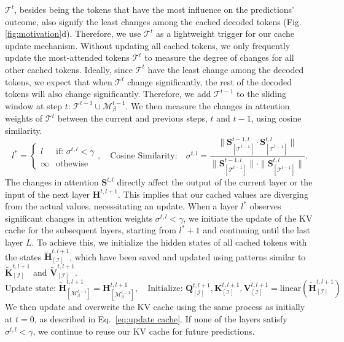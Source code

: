 \documentclass{article} %
\theoremstyle{definition}
\theoremstyle{remark}
\begin{document}
$\mathcal{T}^t$, besides being the tokens that have the most influence on the predictions’ outcome, also signify the least changes among the cached decoded tokens (Fig. \ref{fig:motivation}d). Therefore, we use $\mathcal{T}^t$ as a lightweight trigger for our cache update mechanism. Without updating all cached tokens, we only frequently update the most-attended tokens $\mathcal{T}^t$ to measure the degree of changes for all other cached tokens. Ideally, since $\mathcal{T}^t$ have the least change among the decoded tokens, we expect that when $\mathcal{T}^t$ change significantly, the rest of the decoded tokens will also change significantly. Therefore, we add $\mathcal{T}^{t-1}$ to the sliding window at step $t$: $\mathcal{T}^{t-1} \cup \mathcal{M}^{t-1}_{\beta}$. We then measure the changes in attention weights of $\mathcal{T}^t$ between the current and previous steps, $t$ and $t-1$, using cosine similarity.
\begin{equation}
 l^* = \left\{ \begin{matrix}
     l & \text{if: }  \sigma^{t,l} < \gamma \\ 
     \infty & \text{othewise}
 \end{matrix} \right.,  \quad
 \text{Cosine Similarity:} \quad \sigma^{t,l} =  \frac{\|\mathbf{S}^{t-1,l}_{[\mathcal{T}^{t-1}]} \cdot \mathbf{S}^{t,l}_{[\mathcal{T}^{t-1}]}\|}{\|\mathbf{S}^{t-1,l}_{[\mathcal{T}^{t-1}]}\| \cdot \|\mathbf{S}^{t,l}_{[\mathcal{T}^{t-1}]}\|}.
\end{equation}
The changes in attention $\mathbf{S}^{t,l}$ directly affect the output of the current layer or the input of the next layer $\mathbf{H}^{t,l+1}$. This implies that our cached values are diverging from the actual values, necessitating an update. When a layer $l^*$ observes significant changes in attention weights $\sigma^{t,l} < \gamma$, we initiate the update of the KV cache for the subsequent layers, starting from $l^* + 1$ and continuing until the last layer $L$. To achieve this, we initialize the hidden states of all cached tokens with the states $\mathbf{\tilde H}^{t,l+1}_{[\mathcal{I}]}$, which have been saved and updated using patterns similar to $\mathbf{\tilde K}^{t,l+1}_{[\mathcal{I}]}$ and $\mathbf{\tilde V}^{t,l+1}_{[\mathcal{I}]}$.
\begin{equation}
    \text{Update state: } \mathbf{\tilde H}^{t,l+1}_{[\mathcal{M}^{t-1}_\beta]} = \mathbf{H}^{t,l+1}_{[\mathcal{M}^{t-1}_\beta]}, \quad \text{Initialize: } \mathbf{Q}^{t,l+1}_{[\mathcal{I}]}, \mathbf{K}^{t,l+1}_{[\mathcal{I}]}, \mathbf{V}^{t,l+1}_{[\mathcal{I}]} = \text{linear}(\mathbf{\tilde H}^{t,l+1}_{[\mathcal{I}]}) 
\end{equation}
We then update and overwrite the KV cache using the same process as initially at $t=0$, as described in Eq.~\ref{eq:update cache}. If none of the layers satisfy $\sigma^{t,l} < \gamma$, we continue to reuse our KV cache for future predictions.
\end{document}
